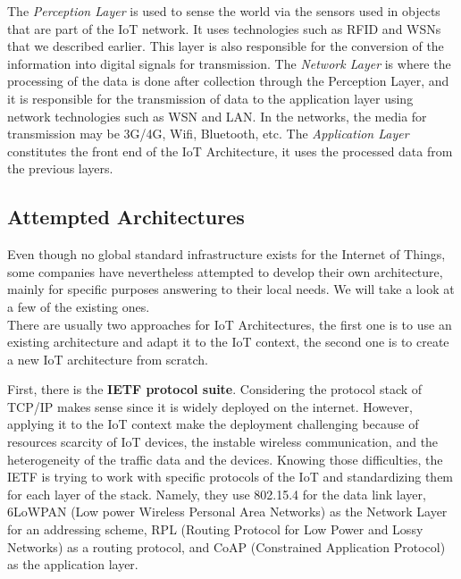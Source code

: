 The \textit{Perception Layer} is used to sense the world via the sensors used in objects that are part of the IoT network. It uses technologies such as RFID and WSNs that we described earlier. This layer is also responsible for the conversion of the information into digital signals for transmission. The \textit{Network Layer} is where the processing of the data is done after collection through the Perception Layer, and it is responsible for the transmission of data to the application layer using network technologies such as WSN and LAN. In the networks, the media for transmission may be 3G/4G, Wifi, Bluetooth, etc. The \textit{Application Layer} constitutes the front end of the IoT Architecture, it uses the processed data from the previous layers.\\


\subsection{Attempted Architectures}

Even though no global standard infrastructure exists for the Internet of Things, some companies have nevertheless attempted to develop their own architecture, mainly for specific purposes answering to their local needs. We will take a look at a few of the existing ones. \\

There are usually two approaches for IoT Architectures, the first one is to use an existing architecture and adapt it to the IoT context, the second one is to create a new IoT architecture from scratch.\\


First, there is the \textbf{IETF protocol suite}. Considering the protocol stack of TCP/IP makes sense since it is widely deployed on the internet. However, applying it to the IoT context make the deployment challenging because of resources scarcity of IoT devices, the instable wireless communication, and the heterogeneity of the traffic data and the devices. Knowing those difficulties, the IETF is trying to work with specific protocols of the IoT and standardizing them  for each layer of the stack. Namely, they use 802.15.4 for the data link layer, 6LoWPAN (Low power Wireless Personal Area Networks) as the Network Layer for an addressing scheme, RPL (Routing Protocol for Low Power and Lossy Networks) as a routing protocol, and CoAP (Constrained Application Protocol) as the application layer.\\

